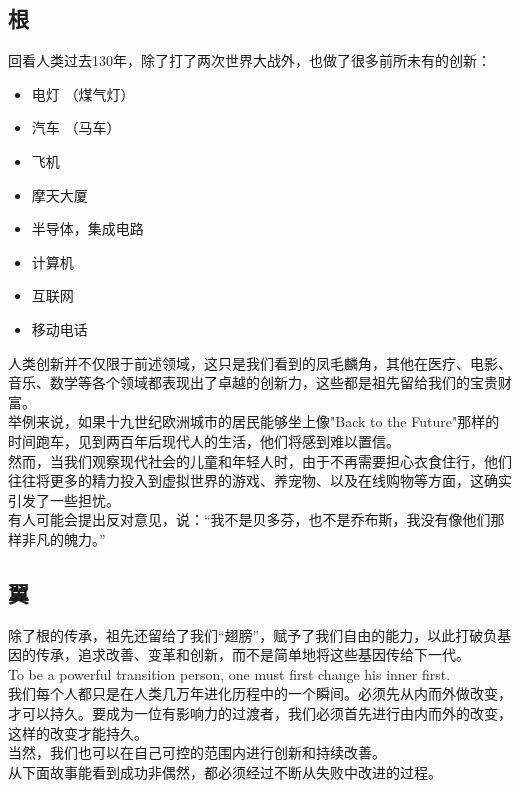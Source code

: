 \hypertarget{ux6839}{%
\subsection{根}\label{ux6839}}

回看人类过去130年，除了打了两次世界大战外，也做了很多前所未有的创新：

\begin{itemize}
\tightlist
\item
  电灯 （煤气灯）
\item
  汽车 （马车）
\item
  飞机
\item
  摩天大厦
\item
  半导体，集成电路
\item
  计算机
\item
  互联网
\item
  移动电话
\end{itemize}

人类创新并不仅限于前述领域，这只是我们看到的凤毛麟角，其他在医疗、电影、音乐、数学等各个领域都表现出了卓越的创新力，这些都是祖先留给我们的宝贵财富。\\
举例来说，如果十九世纪欧洲城市的居民能够坐上像"Back to the
Future"那样的时间跑车，见到两百年后现代人的生活，他们将感到难以置信。\\
然而，当我们观察现代社会的儿童和年轻人时，由于不再需要担心衣食住行，他们往往将更多的精力投入到虚拟世界的游戏、养宠物、以及在线购物等方面，这确实引发了一些担忧。\\
有人可能会提出反对意见，说：``我不是贝多芬，也不是乔布斯，我没有像他们那样非凡的魄力。''

\hypertarget{ux7ffc}{%
\subsection{翼}\label{ux7ffc}}

除了根的传承，祖先还留给了我们``翅膀''，赋予了我们自由的能力，以此打破负基因的传承，追求改善、变革和创新，而不是简单地将这些基因传给下一代。\\
To be a powerful transition person, one must first change his inner
first.\\
我们每个人都只是在人类几万年进化历程中的一个瞬间。必须先从内而外做改变，才可以持久。要成为一位有影响力的过渡者，我们必须首先进行由内而外的改变，这样的改变才能持久。\\
当然，我们也可以在自己可控的范围内进行创新和持续改善。\\

从下面故事能看到成功非偶然，都必须经过不断从失败中改进的过程。

